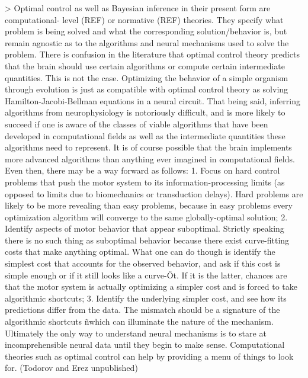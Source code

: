 \documentclass[../main.tex]{subfiles}
\begin{document}
{{> Optimal control as well as Bayesian inference in their present form are computational- level (REF) or normative (REF) theories. They specify what problem is being solved and what the corresponding solution/behavior is, but remain agnostic as to the algorithms and neural mechanisms used to solve the problem. There is confusion in the literature that optimal control theory predicts that the brain should use certain algorithms or compute certain intermediate quantities. This is not the case. Optimizing the behavior of a simple organism through evolution is just as compatible with optimal control theory as solving Hamilton-Jacobi-Bellman equations in a neural circuit. That being said, inferring algorithms from neurophysiology is notoriously difficult, and is more likely to succeed if one is aware of the classes of viable algorithms that have been developed in computational fields as well as the intermediate quantities these algorithms need to represent. It is of course possible that the brain implements more advanced algorithms than anything ever imagined in computational fields. Even then, there may be a way forward as follows:
1. Focus on hard control problems that push the motor system to its information-processing limits (as opposed to limits due to biomechanics or transduction delays). Hard problems are likely to be more revealing than easy problems, because in easy problems every optimization algorithm will converge to the same globally-optimal solution;
2. Identify aspects of motor behavior that appear suboptimal. Strictly speaking there is no such thing as suboptimal behavior because there exist curve-fitting costs that make anything optimal. What one can do though is identify the simplest cost that accounts for the observed behavior, and ask if this cost is simple enough or if it still looks like a curve-Öt. If it is the latter, chances are that the motor system is actually optimizing a simpler cost and is forced to take algorithmic shortcuts;
3. Identify the underlying simpler cost, and see how its predictions differ from the data. The mismatch should be a signature of the algorithmic shortcuts ñwhich can illuminate the nature of the mechanism.
Ultimately the only way to understand neural mechanisms is to stare at incomprehensible neural data until they begin to make sense. Computational theories such as optimal control can help by providing a menu of things to look for.
(Todorov and Erez unpublished)


}}
\end{document}
